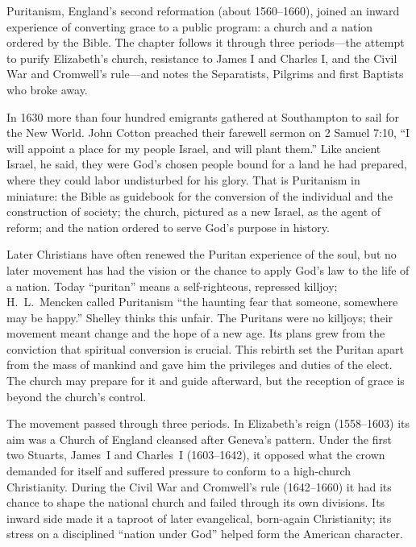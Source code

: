 
\begin{inbrief}
Puritanism, England's second reformation (about 1560--1660), joined an inward experience of converting
grace to a public program: a church and a nation ordered by the Bible. The chapter follows it through
three periods---the attempt to purify Elizabeth's church, resistance to James I and Charles I, and
the Civil War and Cromwell's rule---and notes the Separatists, Pilgrims and first Baptists who broke
away.
\end{inbrief}

In 1630 more than four hundred emigrants gathered at Southampton to sail for the New World. John
Cotton preached their farewell sermon on 2 Samuel 7:10, ``I will appoint a place for my people
Israel, and will plant them.'' Like ancient Israel, he said, they were God's chosen people bound for
a land he had prepared, where they could labor undisturbed for his glory. That is Puritanism in
miniature: the Bible as guidebook for the conversion of the individual and the construction of
society; the church, pictured as a new Israel, as the agent of reform; and the nation ordered to
serve God's purpose in history.

Later Christians have often renewed the Puritan experience of the soul, but no later movement has had
the vision or the chance to apply God's law to the life of a nation. Today ``puritan'' means a
self-righteous, repressed killjoy; H.~L.~Mencken called Puritanism ``the haunting fear that someone,
somewhere may be happy.'' Shelley thinks this unfair. The Puritans were no killjoys; their movement meant change and the hope of a new age. Its plans grew from the conviction that spiritual conversion is crucial. This
rebirth set the Puritan apart from the mass of mankind and gave him the privileges and duties of the
elect. The church may prepare for it and guide afterward, but the reception of grace is beyond the
church's control.

The movement passed through three periods. In Elizabeth's reign (1558--1603) its aim was a Church of England cleansed after Geneva's pattern. Under the first two Stuarts, James~I and Charles~I (1603--1642), it opposed what the crown demanded for itself and suffered pressure to conform to a high-church Christianity. During the Civil War and
Cromwell's rule (1642--1660) it had its chance to shape the national church and failed through its
own divisions. Its inward side made it a taproot of later evangelical, born-again Christianity; its
stress on a disciplined ``nation under God'' helped form the American character.

